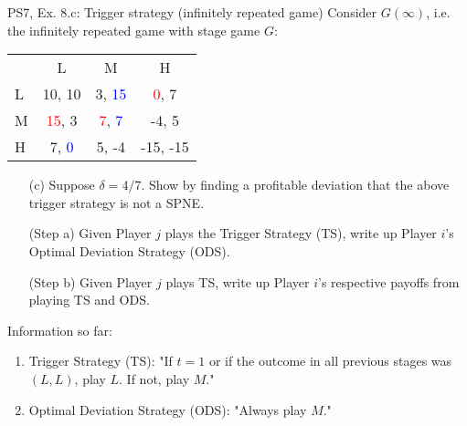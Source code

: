 \begin{frame}{PS7, Ex. 8.c: Trigger strategy (infinitely repeated game)}
    Consider $G(\infty)$, i.e. the infinitely repeated game with stage game $G$: \vspace{-6pt}
    \begin{table}
      \begin{tabular}{l|c|c|c|}
        \multicolumn{1}{c}{} & \multicolumn{1}{c}{L} & \multicolumn{1}{c}{M} & \multicolumn{1}{c}{H} \\\cline{2-4}
        L & 10, 10 & 3, \textcolor{blue}{15} & \textcolor{red}{0}, 7 \\\cline{2-4}
        M & \textcolor{red}{15}, 3 & \textcolor{red}{7}, \textcolor{blue}{7} & -4, 5 \\\cline{2-4}
        H & 7, \textcolor{blue}{0} & 5, -4 & -15, -15 \\\cline{2-4}
      \end{tabular}
    \end{table}
    \begin{itemize}
      \vspace{-4pt} \item[(c)] Suppose $\delta = 4/7$. Show by finding a profitable deviation that the above trigger strategy is not a SPNE. \vspace{-6pt}
    \end{itemize}
  \begin{multicols}{2}
    \begin{itemize}
      \item[(Step a)] Given Player $j$ plays the Trigger Strategy (TS), write up Player $i$'s Optimal Deviation Strategy (ODS).
      \item[(Step b)] Given Player $j$ plays TS, write up Player $i$'s respective payoffs from playing TS and ODS.
    \end{itemize}
    \vfill\null\columnbreak
    Information so far:
    \begin{enumerate}
      \item Trigger Strategy (TS): "If $t=1$ or if the outcome in all previous stages was $(L,L)$, play $L$. If not, play $M$."
      \item Optimal Deviation Strategy (ODS): "Always play $M$."
    \end{enumerate}
    \vfill\null
  \end{multicols}
\end{frame}
